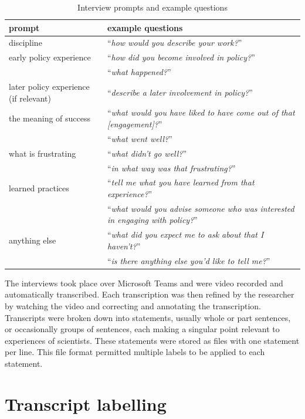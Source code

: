 \begin{table}[!ht]
    \footnotesize
    \caption{Interview prompts and example questions}\label{tab:metinterview}
    \begin{tabular}{L{.4\linewidth}L{.6\linewidth}}  \hline
    \textbf{prompt} & \textbf{example questions} \\ \hline \hline
    discipline & ``\textit{how would you describe your work?}'' \rule[-2ex]{0pt}{6ex}\\
    early policy experience & ``\textit{how did you become involved in policy?}'' \\
     & ``\textit{what happened?}'' \\[2ex]
    later policy experience (if relevant) & ``\textit{describe a later involvement in policy?}'' \\
    the meaning of success & ``\textit{what would you have liked to have come out of that [engagement]?}''\\
     & ``\textit{what went well?}'' \\[2ex]
    what is frustrating & ``\textit{what didn't go well?}'' \\
     & ``\textit{in what way was that frustrating?}''\\[2ex]
    learned practices  & ``\textit{tell me what you have learned from that experience?}'' \\
     & ``\textit{what would you advise someone who was interested in engaging with policy?}''\\[2ex]
    anything else & ``\textit{what did you expect me to ask about that I haven't?}'' \\
     & ``\textit{is there anything else you'd like to tell me?}'' \\[2ex] \hline
    \end{tabular}
\end{table}

The interviews took place over Microsoft Teams and were video recorded and automatically transcribed. Each transcription was then refined by the researcher by watching the video and correcting and annotating the transcription. Transcripts were broken down into statements, usually whole or part sentences, or occasionally groups of sentences, each making a singular point relevant to experiences of scientists. These statements were stored as \CSV{} files with one statement per line. This file format permitted multiple labels to be applied to each statement.

\section{Transcript labelling}\label{sec:metlabelling}

